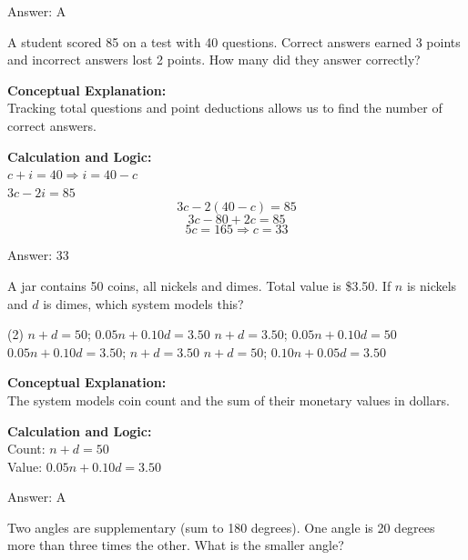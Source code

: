 \documentclass[11pt,paper=a4,answers]{exam}
\begin{document}
\begin{questions}
\begin{solution}
\vspace{15pt}
Answer: \colorbox{yellow!100}{A}
\end{solution}

\question
A student scored 85 on a test with 40 questions. Correct answers earned 3 points and incorrect answers lost 2 points. How many did they answer correctly?

\begin{solution}
\textbf{Conceptual Explanation:} \\
Tracking total questions and point deductions allows us to find the number of correct answers.

\vspace{10pt}
\textbf{Calculation and Logic:} \\
$c + i = 40 \Rightarrow i = 40 - c$ \\
$3c - 2i = 85$ \\
\[3c - 2(40 - c) = 85\]
\[3c - 80 + 2c = 85\]
\[5c = 165 \Rightarrow c = 33\]

\vspace{15pt}
Answer: \colorbox{yellow!100}{33}
\end{solution}

\question
A jar contains 50 coins, all nickels and dimes. Total value is \$3.50. If $n$ is nickels and $d$ is dimes, which system models this?
\begin{tasks}(2)
    \task $n + d = 50$; $0.05n + 0.10d = 3.50$
    \task $n + d = 3.50$; $0.05n + 0.10d = 50$
    \task $0.05n + 0.10d = 3.50$; $n + d = 3.50$
    \task $n + d = 50$; $0.10n + 0.05d = 3.50$
\end{tasks}

\begin{solution}
\textbf{Conceptual Explanation:} \\
The system models coin count and the sum of their monetary values in dollars.

\vspace{10pt}
\textbf{Calculation and Logic:} \\
Count: $n + d = 50$ \\
Value: $0.05n + 0.10d = 3.50$

\vspace{15pt}
Answer: \colorbox{yellow!100}{A}
\end{solution}

\question
Two angles are supplementary (sum to 180 degrees). One angle is 20 degrees more than three times the other. What is the smaller angle?


\end{questions}
\end{document}

